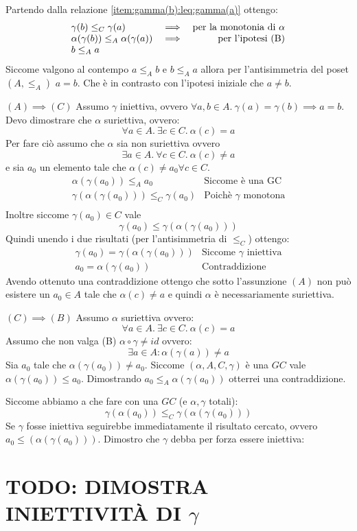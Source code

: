{	Partendo dalla relazione \ref{item:gamma(b):leq:gamma(a)} ottengo:
	\begin{displaymath}
	\begin{array}[\textwidth]{llr}
	\gamma(b) \leq_C \gamma(a) 					& \implies & \text{per la monotonia di $\alpha$} \\
	\alpha(\gamma(b)) \leq_A \alpha(\gamma(a))  & \implies & \text{per l'ipotesi (B)} \\
	b \leq_A a									& \\
	\end{array}
	\end{displaymath}
	Siccome valgono al contempo $a \leq_A b$ e $b \leq_A a$ allora per l'antisimmetria del poset $(A, \leq_A)$
	$a = b$. Che è in contrasto con l'ipotesi iniziale che $a \neq b$.
	
	$\boxed{(A) \implies (C)}$
	Assumo $\gamma$ iniettiva, ovvero $\forall a,b \in A . \ \gamma(a) = \gamma(b) \implies a = b$.
	Devo dimostrare che $\alpha$ suriettiva, ovvero:
	$$
	\forall a \in A .\ \exists c \in C .\ \alpha(c) = a
	$$  
	Per fare ciò assumo che $\alpha$ sia non suriettiva ovvero
	$$
	\exists a \in A .\ \forall c \in C .\ \alpha(c) \neq a
	$$
	e sia $a_0$ un elemento tale che $\alpha(c) \neq a_0 \forall c \in C$.
	$$
	\begin{array}{ll}
	\alpha(\gamma(a_0)) \leq_A a_0 & \text{Siccome è una GC} \\
	\gamma(\alpha(\gamma(a_0))) \leq_C \gamma(a_0) & \text{Poichè $\gamma$ monotona} \\	
	\end{array}
	$$
	Inoltre siccome $\gamma(a_0) \in C$ vale 
	$$
	\gamma(a_0) \leq \gamma(\alpha(\gamma(a_0)))
	$$
	Quindi unendo i due risultati (per l'antisimmetria di $\leq_C$) ottengo:
	$$
	\begin{array}{ll}
	\gamma(a_0) = \gamma(\alpha(\gamma(a_0))) & \text{Siccome $\gamma$ iniettiva} \\
	a_0 = \alpha(\gamma(a_0)) & \text{Contraddizione}
	\end{array}
	$$
	Avendo ottenuto una contraddizione ottengo che sotto l'assunzione $(A)$ non può esistere un $a_0 \in A$ tale che $\alpha(c) \neq a$ e quindi $\alpha$ è necessariamente suriettiva.
	
	
	$\boxed{(C) \implies (B)}$
	Assumo $\alpha$ suriettiva ovvero:
	$$
	\forall a \in A . \ \exists c \in C . \ \alpha(c) = a
	$$
	Assumo che non valga (B) $\alpha \circ \gamma \neq id$ ovvero:
	$$
	\exists a \in A : \alpha(\gamma(a)) \neq a
	$$
	Sia $a_0$ tale che $\alpha(\gamma(a_0)) \neq a_0$.
	Siccome $(\alpha, A, C, \gamma)$ è una $GC$ vale $\alpha(\gamma(a_0)) \leq a_0$.
	Dimostrando $a_0 \leq_A \alpha(\gamma(a_0))$ otterrei una contraddizione.
	
	Siccome abbiamo a che fare con una $GC$ (e $\alpha, \gamma$ totali):
	$$
	\gamma(\alpha(a_0)) \leq_C \gamma(\alpha(\gamma(a_0))) 
	$$
	Se $\gamma$ fosse iniettiva seguirebbe immediatamente il risultato cercato, ovvero
	$a_0 \leq (\alpha(\gamma(a_0)))$.
	Dimostro che $\gamma$ debba per forza essere iniettiva:
	\section{TODO: DIMOSTRA INIETTIVITÀ DI $\gamma$}
}